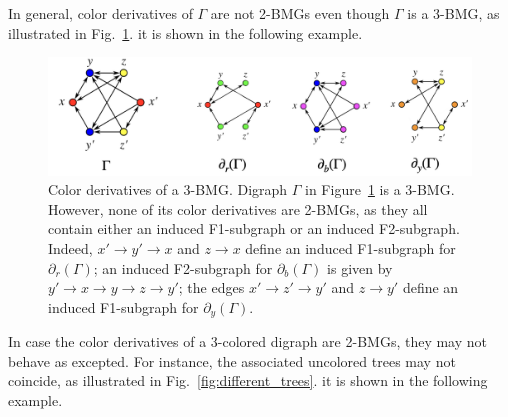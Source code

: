 \documentclass[final,3p,times]{elsarticle}
\newtheorem{example}{Example}[section]
\newcommand{\OLD}[1]{\begingroup\tiny\color{gray}#1\endgroup}
\newcommand{\mh}[1]{\begingroup\color{magenta}#1\endgroup}
\begin{document}
In general, color derivatives of $\Gamma$ are not 2-BMGs even though $\Gamma$ is a 3-BMG, as \mh{illustrated in Fig.\ \ref{fig:color_derivatives}.}
\OLD{it is shown in the following example.}

\begin{figure}[ht]
  \centering
    \includegraphics[width=16cm]{figures/color_derivatives.png}
    \caption{Color derivatives of a 3-BMG.
    Digraph $\Gamma$ in Figure~\ref{fig:color_derivatives} is a 3-BMG. However,
    none of its color derivatives are 2-BMGs, as they all contain either an
    induced F1-subgraph or an induced F2-subgraph. Indeed, $x'\rightarrow
    y'\rightarrow x$ and $z\rightarrow x$ define an induced F1-subgraph for
    $\partial_r(\Gamma)$; an induced F2-subgraph for $\partial_b(\Gamma)$ is
    given by $y'\rightarrow x\rightarrow y\rightarrow z\rightarrow y'$; the
    edges $x'\rightarrow z'\rightarrow y'$ and $z \rightarrow y'$ define an
    induced F1-subgraph for $\partial_y(\Gamma)$.
}
      \label{fig:color_derivatives}
\end{figure}


In case the color derivatives of a 3-colored digraph are 2-BMGs, they may not behave as excepted. For instance, the associated uncolored trees may not coincide, as 
\mh{illustrated in Fig.\ \ref{fig:different_trees}.}
\OLD{it is shown in the following example. }
\end{document}
